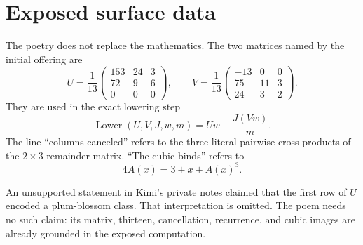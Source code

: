 \documentclass[12pt]{article}
\begin{document}
\section*{Exposed surface data}
The poetry does not replace the mathematics.  The two matrices named by the
initial offering are
\[
U=\frac1{13}
\begin{pmatrix}
153&24&3\\72&9&6\\0&0&0
\end{pmatrix},
\qquad
V=\frac1{13}
\begin{pmatrix}
-13&0&0\\75&11&3\\24&3&2
\end{pmatrix}.
\]
They are used in the exact lowering step
\[
\operatorname{Lower}(U,V,J,w,m)=Uw-\frac{J(Vw)}m.
\]
The line ``columns canceled'' refers to the three literal pairwise
cross-products of the $2\times3$ remainder matrix.  ``The cubic binds'' refers
to
\[
4A(x)=3+x+A(x)^3.
\]

\begin{tcolorbox}[colback=snow,colframe=plum,boxrule=0.5pt,arc=2mm]
An unsupported statement in Kimi's private notes claimed that the first row of
$U$ encoded a plum-blossom class.  That interpretation is omitted.  The poem
needs no such claim: its matrix, thirteen, cancellation, recurrence, and cubic
images are already grounded in the exposed computation.
\end{tcolorbox}
\end{document}
